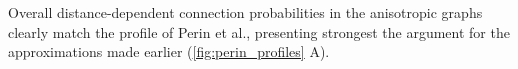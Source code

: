 

Overall distance-dependent connection probabilities in the anisotropic
graphs clearly match the profile of Perin et al., presenting
strongest the argument for the approximations made earlier
(\autoref{fig:perin_profiles} A).   







